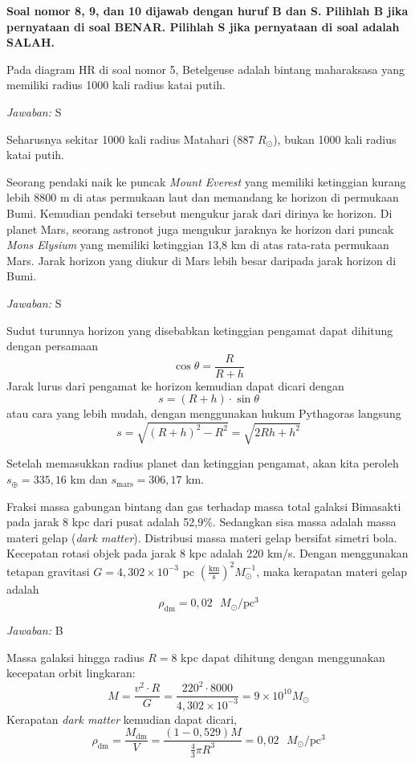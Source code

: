 \documentclass[11pt,fleqn]{exam}
\newcommand*{\Rsun}{\ensuremath{R_{\odot}}}
\begin{document}
\begin{questions}
\vspace{1cm}
\textbf{Soal nomor 8, 9, dan 10 dijawab dengan huruf B dan S. Pilihlah B jika pernyataan di soal BENAR. Pilihlah S jika pernyataan di soal adalah SALAH.}


\question Pada diagram HR di soal nomor 5, Betelgeuse adalah bintang maharaksasa yang memiliki radius 1000 kali radius katai putih.


\textit{Jawaban: }S

Seharusnya sekitar 1000 kali radius Matahari (887 \Rsun), bukan 1000 kali radius katai putih.


\vspace{0.5cm}
\question Seorang pendaki naik ke puncak \textit{Mount Everest} yang memiliki ketinggian kurang lebih 8800 m di atas permukaan laut dan memandang ke horizon di permukaan Bumi. Kemudian pendaki tersebut mengukur jarak dari dirinya ke horizon. Di planet Mars, seorang astronot juga mengukur jaraknya ke horizon dari puncak \textit{Mons Elysium} yang memiliki ketinggian 13,8 km di atas rata-rata permukaan Mars. Jarak horizon yang diukur di Mars lebih besar daripada jarak horizon di Bumi.


\textit{Jawaban: }S

Sudut turunnya horizon yang disebabkan ketinggian pengamat dapat dihitung dengan persamaan
$$\cos{\theta} = \frac{R}{R + h}$$
Jarak lurus dari pengamat ke horizon kemudian dapat dicari dengan
$$s = (R+h) \cdot \sin{\theta}$$
atau cara yang lebih mudah, dengan menggunakan hukum Pythagoras langsung
$$s = \sqrt{(R+h)^2 - R^2} = \sqrt{2Rh + h^2}$$

Setelah memasukkan radius planet dan ketinggian pengamat, akan kita peroleh
$s_\oplus = 335,16$ km dan $s_\text{mars} = 306,17$ km. 


\vspace{0.5cm}
\question Fraksi massa gabungan bintang dan gas terhadap massa total galaksi Bimasakti pada jarak 8 kpc dari pusat adalah 52,9\%. Sedangkan sisa massa adalah massa materi gelap (\textit{dark matter}). Distribusi massa materi gelap bersifat simetri bola. Kecepatan rotasi objek pada jarak 8 kpc adalah 220 km/s. Dengan menggunakan tetapan gravitasi $G = 4,302 \times 10^{-3}$ pc $\left( \frac{\text{km}}{\text{s}} \right)^2 M_{\odot}^{-1}$, maka kerapatan materi gelap adalah
$$\rho_{\text{dm}} = 0,02 \text{ } M_{\odot}/\text{pc}^{3}$$


\textit{Jawaban: }B

Massa galaksi hingga radius $R = 8$ kpc dapat dihitung dengan menggunakan kecepatan orbit lingkaran:
\begin{equation*}
M = \frac{v^2 \cdot R}{G} = \frac{220^2 \cdot 8000}{4,302 \times 10^{-3}} = 9 \times 10^{10} M_{\odot} 
\end{equation*}
Kerapatan \textit{dark matter} kemudian dapat dicari,
\begin{equation*}
\rho_{\text{dm}} = \frac{M_{\text{dm}}}{V} = \frac{(1 - 0,529) M}{\frac{4}{3} \pi R^3} = 0,02 \text{ } M_{\odot}/\text{pc}^{3} 
\end{equation*}



\end{questions}
\end{document}
